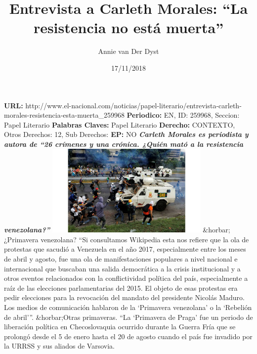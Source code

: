 \documentclass{article}%
\title{\textbf{Entrevista a Carleth Morales: “La resistencia no está muerta”}}%
\author{Annie van Der Dyst}%
\date{17/11/2018}%
\begin{document}
%
\normalsize%
\maketitle%
\textbf{URL: }%
http://www.el{-}nacional.com/noticias/papel{-}literario/entrevista{-}carleth{-}morales{-}resistencia{-}esta{-}muerta\_259968\newline%
%
\textbf{Periodico: }%
EN, %
ID: %
259968, %
Seccion: %
Papel Literario\newline%
%
\textbf{Palabras Claves: }%
Papel Literario\newline%
%
\textbf{Derecho: }%
CONTEXTO, %
Otros Derechos: %
12, %
Sub Derechos: %
\newline%
%
\textbf{EP: }%
NO\newline%
\newline%
%
\textbf{\textit{Carleth Morales es periodista y autora de “26 crímenes y una crónica. ¿Quién mató a la resistencia venezolana?”}}%
\newline%
\newline%
%
\includegraphics[width=300px]{210.jpg}%
\newline%
%
\&horbar;¿Primavera venezolana?%
\newline%
%
“Si consultamos Wikipedia esta nos refiere que la ola de protestas que sacudió a Venezuela en el año 2017, especialmente entre los meses de abril y agosto, fue una ola de manifestaciones populares a nivel nacional e internacional que buscaban una salida democrática a la crisis institucional y a otros eventos relacionados con la conflictividad política del país, especialmente a raíz de las elecciones parlamentarias del 2015. El objeto de esas protestas era pedir elecciones para la revocación del mandato del presidente Nicolás Maduro.%
\newline%
%
Los medios de comunicación hablaron de la ‘Primavera venezolana’ o la ‘Rebelión de abril’”.%
\newline%
%
\&horbar;Otras primaveras.%
\newline%
%
“La ‘Primavera de Praga’ fue un periodo de liberación política en Checoslovaquia ocurrido durante la Guerra Fría que se prolongó desde el 5 de enero hasta el 20 de agosto cuando el país fue invadido por la URRSS y sus aliados de Varsovia.%
\end{document}
